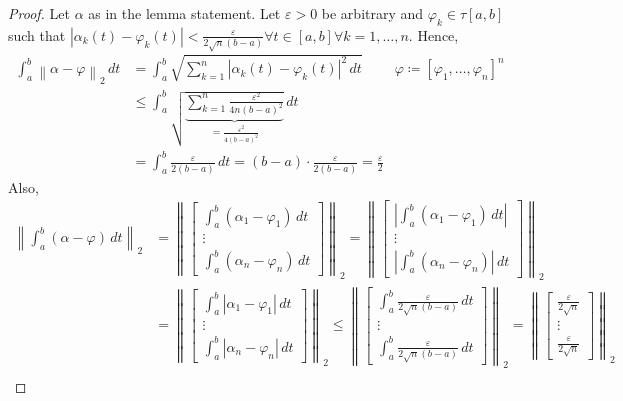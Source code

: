 \documentclass{article}
\newcommand{\norm}[1]{\left\|#1\right\|}
\newcommand{\card}[1]{\left|#1\right|}
\begin{document}
\begin{proof}
  Let $\alpha$ as in the lemma statement.
  Let $\varepsilon > 0$ be arbitrary and $\varphi_k \in \tau[a,b]$ such that $\card{\alpha_k(t) - \varphi_k(t)} < \frac{\varepsilon}{2 \sqrt{n} (b - a)} \forall t \in [a,b] \forall k = 1, \dots, n$. Hence,
  \begin{align*}
    \int_a^b \norm{\alpha - \varphi}_2 \, dt &= \int_a^b \sqrt{\sum_{k=1}^n \card{\alpha_k(t) - \varphi_k(t)}^2 \, dt}
          & \varphi \coloneqq [\varphi_1, \dots, \varphi_n]^n \\
        &\leq \int_a^b \sqrt{\underbrace{\sum_{k=1}^n \frac{\varepsilon^2}{4n (b - a)^2}}_{= \frac{\varepsilon^2}{4 (b - a)^2}}} \, dt \\
        &= \int_a^b \frac{\varepsilon}{2 (b - a)} \, dt = (b - a) \cdot \frac{\varepsilon}{2 (b - a)} = \frac{\varepsilon}{2}
  \end{align*}
  Also,
  \begin{align*}
    \norm{\int_a^b (\alpha - \varphi) \, dt}_2
      &= \norm{\begin{bmatrix} \int_a^b (\alpha_1 - \varphi_1) \, dt \\ \vdots \\ \int_a^b (\alpha_n - \varphi_n) \, dt \end{bmatrix}}_2
      = \norm{\begin{bmatrix} \card{\int_a^b (\alpha_1 - \varphi_1) \, dt} \\ \vdots \\ \card{\int_a^b (\alpha_n - \varphi_n)} \, dt \end{bmatrix}}_2 \\
      &= \norm{\begin{bmatrix} \int_a^b \card{\alpha_1 - \varphi_1} \, dt \\ \vdots \\ \int_a^b \card{\alpha_n - \varphi_n} \, dt \end{bmatrix}}_2
      \leq \norm{\begin{bmatrix} \int_a^b \frac{\varepsilon}{2\sqrt n (b - a)} \, dt \\ \vdots \\ \int_a^b \frac{\varepsilon}{2 \sqrt n (b - a)} \, dt \end{bmatrix}}_2
      = \norm{\begin{bmatrix} \frac{\varepsilon}{2 \sqrt n} \\ \vdots \\ \frac{\varepsilon}{2 \sqrt n} \end{bmatrix}}_2 \\

\end{align*}
\end{proof}
\end{document}
